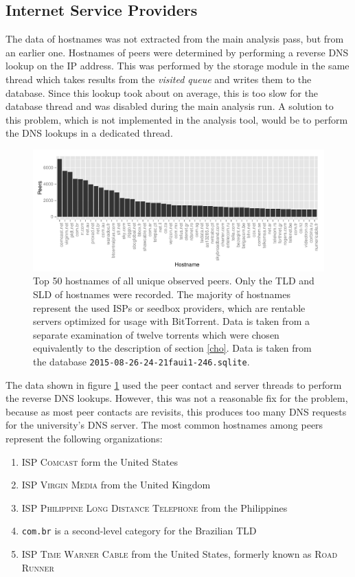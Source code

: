 \documentclass[10pt, a4paper, twoside=false, headsepline]{scrbook}
\renewcommand{\_}{\origunderscore\allowbreak}
\begin{document}
\subsection{Internet Service Providers}
The data of hostnames was not extracted from the main analysis pass, but from an earlier one. Hostnames of peers were determined by performing a reverse DNS lookup on the IP address. This was performed by the storage module in the same thread which takes results from the \emph{visited queue} and writes them to the database. Since this lookup took about  on average, this is too slow for the database thread and was disabled during the main analysis run.
A solution to this problem, which is not implemented in the analysis tool, would be to perform the DNS lookups in a dedicated thread.

\begin{figure}
\centering
\includegraphics[width=\textwidth]{../result/2015-08-26_11-24-21_faui1-246_hostnames}
\caption[Most observed ISPs by hostname]{Top 50 hostnames of all unique observed peers. Only the TLD and SLD of hostnames were recorded. The majority of hostnames represent the used ISPs or seedbox providers, which are rentable servers optimized for usage with BitTorrent. Data is taken from a separate examination of twelve torrents which were chosen equivalently to the description of section \ref{cho}. Data is taken from the database \texttt{2015-08-26\_11-24-21\_faui1-246.sqlite}.}
\label{hostname}
\end{figure}

The data shown in figure \ref{hostname} used the peer contact and server threads to perform the reverse DNS lookups. However, this was not a reasonable fix for the problem, because as most peer contacts are revisits, this produces too many DNS requests for the university's DNS server. The most common hostnames among peers represent the following organizations:
\begin{enumerate}
\item ISP \textsc{Comcast} form the United States
\item ISP \textsc{Virgin Media} from the United Kingdom
\item ISP \textsc{Philippine Long Distance Telephone} from the Philippines
\item \texttt{com.br} is a second-level category for the Brazilian TLD
\item ISP \textsc{Time Warner Cable} from the United States, formerly known as \textsc{Road Runner}
\end{enumerate}
\end{document}
